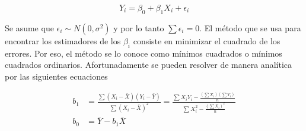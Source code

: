 \documentclass[]{book}
\theoremstyle{definition}
\theoremstyle{definition}
\theoremstyle{definition}
\theoremstyle{remark}
\begin{document}
\begin{equation}
Y_i = \beta_0 + \beta_1 X_i + \epsilon_i
\label{eq:reg2}
\end{equation}

Se asume que \(\epsilon_i\sim N\left ( 0, \sigma^2 \right )\) y por lo
tanto \(\sum \epsilon_i = 0\). El método que se usa para encontrar los
estimadores de los \(\beta_i\) consiste en minimizar el cuadrado de los
errores. Por eso, el método se lo conoce como mínimos cuadrados o
mínimos cuadrados ordinarios. Afortunadamente se pueden resolver de
manera analítica por las siguientes ecuaciones

\begin{equation}
\begin{aligned}
b_1 &= \frac{\sum(X_i-\bar X)(Y_i-\bar Y)}{\sum (X_i-\bar X)^{2}}=
\frac{\sum X_iY_i-\frac{\left (\sum X_i\right)\left ( \sum Y_i\right )}{n}}{\sum X_i^2-\frac{\left (\sum X_i \right )^2}{n}}
\label{eq:b1}\\
b_0 &= \bar Y - b_1\bar X
\end{aligned}
\end{equation}
\end{document}
